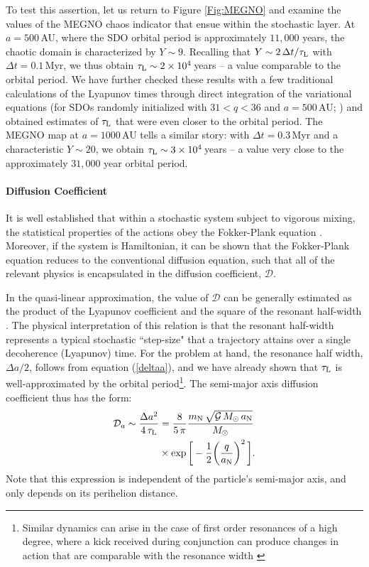 \documentclass[twocolumn]{aastex62}
\newcommand{\G}{\mathcal{G}}
\newcommand{\Msun}{M_{\odot}}
\newcommand{\mn}{m_{\rm{N}}}
\newcommand{\an}{a_{\rm{N}}}
\begin{document}
To test this assertion, let us return to Figure \ref{Fig:MEGNO} and examine the values of the MEGNO chaos indicator that ensue within the stochastic layer. At $a=500\,$AU, where the SDO orbital period is approximately $11{,}000$ years, the chaotic domain is characterized by $Y\sim9$. Recalling that $Y\sim2\,\Delta t/\tau_{\rm{L}}$ with $\Delta t=0.1\,$Myr, we thus obtain $\tau_{\rm{L}}\sim2\times10^{4}\,$years -- a value comparable to the orbital period. We have further checked these results with a few traditional calculations of the Lyapunov times through direct integration of the variational equations (for SDOs randomly initialized with $31<q<36$ and $a=500\,$AU; \citealt{2016MNRAS.459.2275R}) and obtained estimates of $\tau_{\rm{L}}$ that were even closer to the orbital period. The MEGNO map at $a=1000\,$AU tells a similar story: with $\Delta t = 0.3\,$Myr and a characteristic $Y\sim20$, we obtain $\tau_{\rm{L}}\sim3\times10^{4}\,$years -- a value very close to the approximately $31{,}000$ year orbital period. 

\paragraph{Diffusion Coefficient} It is well established that within a stochastic system subject to vigorous mixing, the statistical properties of the actions obey the Fokker-Plank equation \citep{1945RvMP...17..323W}. Moreover, if the system is Hamiltonian, it can be shown that the Fokker-Plank equation reduces to the conventional diffusion equation, such that all of the relevant physics is encapsulated in the diffusion coefficient, $\mathcal{D}$. 

In the quasi-linear approximation, the value of $\mathcal{D}$ can be generally estimated as the product of the Lyapunov coefficient and the square of the resonant half-width \citep{Chirikov1979, LLbook}. The physical interpretation of this relation is that the resonant half-width represents a typical stochastic ``step-size" that a trajectory attains over a single decoherence (Lyapunov) time. For the problem at hand, the resonance half width, $\Delta a/2$, follows from equation (\ref{deltaa}), and we have already shown that $\tau_{\rm{L}}$ is well-approximated by the orbital period\footnote{Similar dynamics can arise in the case of first order resonances of a high degree, where a kick received during conjunction can produce changes in action that are comparable with the resonance width \citep{1994A&A...289..972S}}. The semi-major axis diffusion coefficient thus has the form:
\begin{align}
\mathcal{D}_a\sim\frac{\Delta a^2}{4\,\tau_{\rm{L}}}&=\frac{8}{5\,\pi}\frac{\mn\,\sqrt{\G\,\Msun\,\an}}{\Msun} \nonumber \\
&\times \exp\bigg[-\frac{1}{2}\bigg(\frac{q}{\an}\bigg)^2\,\bigg].
\label{Diffcoeff}
\end{align}
Note that this expression is independent of the particle's semi-major axis, and only depends on its perihelion distance. 
\end{document}
